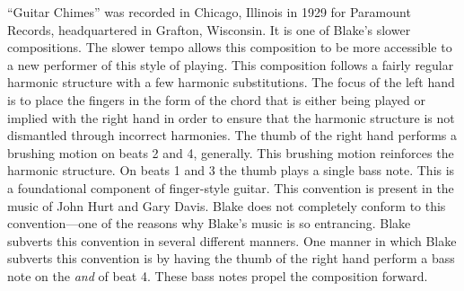 \documentclass{tufte-handout}
\begin{document}
``Guitar Chimes'' was recorded in Chicago, Illinois in 1929 for Paramount
Records, headquartered in Grafton, Wisconsin. It is one of Blake's slower
compositions. The slower tempo allows this composition to be more accessible
to a new performer of this style of playing. This composition follows a fairly
regular harmonic structure with a few harmonic substitutions. The focus of the
left hand is to place the fingers in the form of the chord that is either being played or implied with the right hand in order to ensure that the harmonic structure is not dismantled through incorrect harmonies. The thumb of the right hand performs a brushing motion on beats 2 and 4, generally. This brushing motion reinforces the harmonic structure. On beats 1 and 3 the thumb plays a single bass note. This is a foundational component of finger-style guitar. This convention is present in the music of John Hurt and Gary Davis. Blake does not completely conform to this convention---one of the reasons why Blake's music is so entrancing. Blake subverts this convention in several different manners. One manner in which Blake subverts this convention is by having the thumb of the right hand perform a bass note on the \emph{and} of beat 4. These bass notes propel the composition forward.
\end{document}
